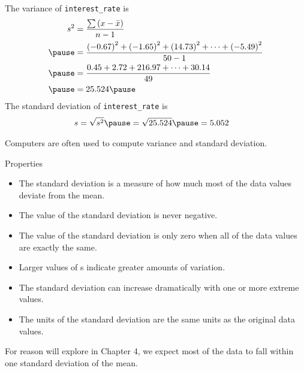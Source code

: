 \documentclass{beamer}
\begin{document}
\begin{frame}
\begin{example}
The variance of \texttt{interest\_rate} is
\begin{equation*}
\begin{aligned}
s^2 &= \dfrac{\sum \left(x-\bar{x}\right)}{n-1}\\\pause
&=  \dfrac{{(-0.67)}^2+{(-1.65)}^2+{(14.73)}^2+\cdots+{(-5.49)}^2}{50-1}  \\\pause
&= \dfrac{0.45+2.72+216.97+\cdots+30.14}{49} \\\pause
&= 25.524\pause
\end{aligned}
\end{equation*}
The standard deviation of \texttt{interest\_rate} is
\begin{equation*}
\begin{aligned}
s &= \sqrt{s^2} \pause = \sqrt{25.524} \pause = 5.052
\end{aligned}
\end{equation*}
\end{example}\pause
\begin{note}
Computers are often used to compute variance and standard deviation.
\end{note}
\end{frame}

\begin{frame}
\begin{block}{Properties}
\begin{itemize}[<+- | alert@+>]
\item The standard deviation is a measure of how much most of the data values deviate from the mean.
\item The value of the standard deviation is never negative.
\item The value of the standard deviation is only zero when all of the data values are exactly the same.
\item Larger values of s indicate greater amounts of variation.
\item The standard deviation can increase dramatically with one or more extreme values.
\item The units of the standard deviation are the same units as the original data values.
\end{itemize}
\end{block}
\onslide<+->
\begin{note}
For reason will explore in Chapter 4, we expect most of the data to fall within one standard deviation of the mean.
\end{note}
\end{frame}
\end{document}
